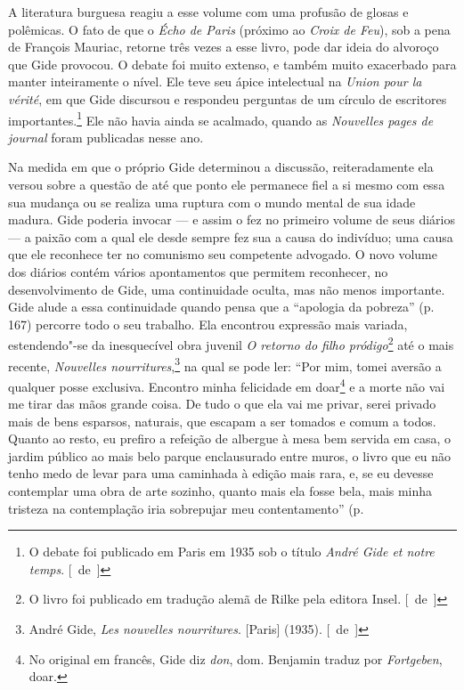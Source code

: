 A literatura burguesa reagiu a esse volume com uma profusão de glosas e
polêmicas. O fato de que o \emph{Écho de Paris} (próximo ao \emph{Croix de Feu}), sob a pena de François Mauriac, retorne três vezes a esse
livro, pode dar ideia do alvoroço que Gide provocou. O debate foi muito
extenso, e também muito exacerbado para manter inteiramente o nível. Ele
teve seu ápice intelectual na \emph{Union pour la vérité}, em que Gide
discursou e respondeu perguntas de um círculo de escritores
importantes.\footnote{O debate foi publicado em Paris em 1935 sob o
  título \emph{André Gide et notre temps}. [~de~]} Ele não havia ainda se
acalmado, quando as \emph{Nouvelles pages de journal} foram publicadas
nesse ano.

Na medida em que o próprio Gide determinou a discussão, reiteradamente
ela versou sobre a questão de até que ponto ele permanece fiel a si
mesmo com essa sua mudança ou se realiza uma ruptura com o mundo mental
de sua idade madura. Gide poderia invocar --- e assim o fez no primeiro
volume de seus diários --- a paixão com a qual ele desde sempre fez sua a
causa do indivíduo; uma causa que ele reconhece ter no comunismo seu
competente advogado. O novo volume dos diários contém vários apontamentos que
permitem reconhecer, no desenvolvimento de Gide, uma continuidade oculta, mas não menos importante. Gide alude a essa continuidade quando pensa
que a ``apologia da pobreza'' (p. 167) percorre todo o seu trabalho.
Ela encontrou expressão mais variada, estendendo"-se da inesquecível obra
juvenil \emph{O retorno do filho pródigo}\footnote{O livro foi
  publicado em tradução alemã de Rilke pela editora Insel. [~de~]} até o
mais recente, \emph{Nouvelles nourritures},\footnote{André Gide,
  \emph{Les nouvelles nourritures}. {[}Paris{]} (1935). [~de~]} na qual
se pode ler: ``Por mim, tomei aversão a qualquer posse exclusiva.
Encontro minha felicidade em doar\footnote{No original em
  francês, Gide diz \emph{don}, dom. Benjamin traduz por \emph{Fortgeben},
  doar. \versal{[N.~T.]}} e a morte não vai me tirar das mãos grande coisa. De tudo o que
ela vai me privar, serei privado mais de bens esparsos, naturais, que
escapam a ser tomados e comum a todos. Quanto ao resto, eu prefiro a
refeição de albergue à mesa bem servida em casa, o jardim público ao
mais belo parque enclausurado entre muros, o livro que eu não tenho medo
de levar para uma caminhada à edição mais rara, e, se eu devesse
contemplar uma obra de arte sozinho, quanto mais ela fosse bela, mais
minha tristeza na contemplação iria sobrepujar meu contentamento'' (p.
